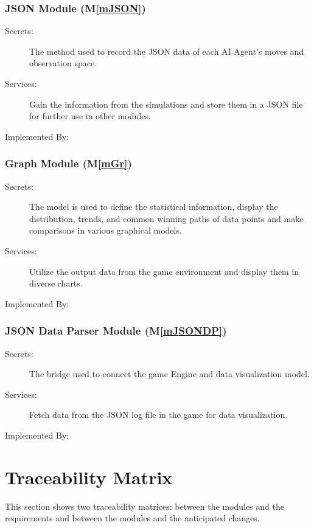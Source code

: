 \documentclass[12pt, titlepage]{article}
\newcommand{\mref}[1]{M\ref{#1}}
\begin{document}
\subsubsection{JSON Module (\mref{mJSON})}
\begin{description}
\item[Secrets:] The method used to record the JSON data of each AI Agent's moves and observation space. 
\item[Services:] Gain the information from the simulations and store them in a JSON file for further use in other modules. 
\item[Implemented By:] \progname{}
\end{description}
\subsubsection{Graph Module (\mref{mGr})}
\begin{description}
\item[Secrets:]  The model is used to define the statistical information, display the distribution, trends, and common winning paths of data points and make comparisons in various graphical models.
\item[Services:] Utilize the output data from the game environment and display them in diverse charts.
\item[Implemented By:] \progname{}
\end{description}
\subsubsection{JSON Data Parser Module (\mref{mJSONDP})}
\begin{description}
\item[Secrets:] The bridge used to connect the game Engine and data visualization model. 
\item[Services:] Fetch data from the JSON log file in the game for data visualization. 
\item[Implemented By:] \progname{}
\end{description}

\section{Traceability Matrix} \label{SecTM}

This section shows two traceability matrices: between the modules and the
requirements and between the modules and the anticipated changes.
\end{document}
